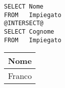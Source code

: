 \begin{lstlisting}
SELECT Nome
FROM   Impiegato
@INTERSECT@
SELECT Cognome
FROM   Impiegato
\end{lstlisting}


\begin{table}[H]
	\centering
	\begin{tabular}{@{} l @{}}
		\toprule
			Nome \\
		\midrule
		 	Franco \\
		\bottomrule
	\end{tabular}
\end{table}
